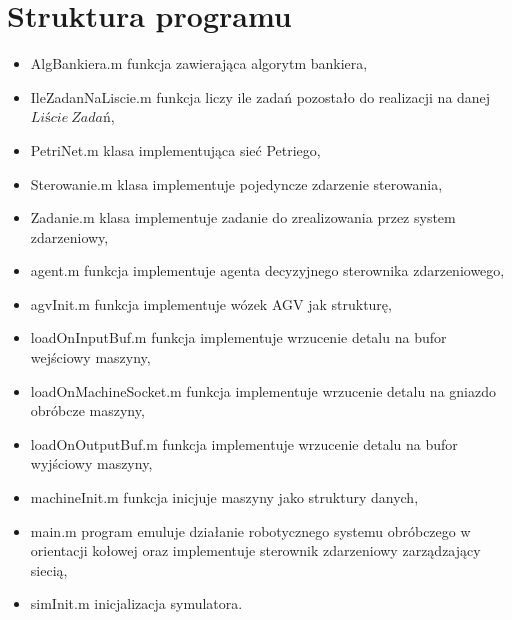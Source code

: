 \documentclass[10pt, a4paper]{article}
\begin{document}
\section{Struktura programu}
\begin{itemize}
\item AlgBankiera.m funkcja zawierająca algorytm bankiera,
\item IleZadanNaLiscie.m funkcja liczy ile zadań pozostało do realizacji na danej $Liście\ Zadań$,
\item PetriNet.m klasa implementująca sieć Petriego,
\item Sterowanie.m klasa implementuje pojedyncze zdarzenie sterowania,
\item Zadanie.m klasa implementuje zadanie do zrealizowania przez system zdarzeniowy,
\item agent.m funkcja implementuje agenta decyzyjnego sterownika zdarzeniowego,
\item agvInit.m funkcja implementuje wózek AGV jak strukturę,
\item loadOnInputBuf.m 	funkcja implementuje wrzucenie detalu na bufor wejściowy maszyny,
\item loadOnMachineSocket.m funkcja implementuje wrzucenie detalu na gniazdo obróbcze maszyny,
\item loadOnOutputBuf.m funkcja implementuje wrzucenie detalu na bufor wyjściowy maszyny,
\item machineInit.m funkcja inicjuje maszyny jako struktury danych,
\item main.m program emuluje działanie robotycznego systemu obróbczego w orientacji kołowej oraz implementuje sterownik zdarzeniowy zarządzający siecią,
\item simInit.m inicjalizacja symulatora.
\end{itemize}
\end{document}
